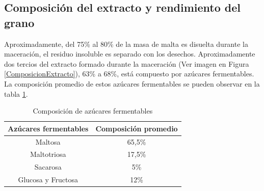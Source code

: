         \subsection{Composición del extracto y rendimiento del grano}
            \par Aproximadamente, del 75\% al 80\% de la masa de malta es disuelta durante la maceración, el residuo insoluble es separado con los desechos. Aproximadamente dos tercios del extracto formado durante la maceración (Ver imagen en Figura \ref{ComposicionExtracto}), 63\% a 68\%, está compuesto por azúcares fermentables. La composición promedio de estos azúcares fermentables se pueden observar en la tabla \ref{tab:ComposicionAzucaresFermentables}.
            
            \begin{table}[h]
                \centering
                \begin{tabular}{|c|c|}
                    \hline
                     Azúcares fermentables &  Composición promedio \\
                     \hline
                     Maltosa & 65,5\% \\
                     \hline
                     Maltotriosa & 17,5\% \\
                     \hline
                     Sacarosa & 5\% \\
                     \hline
                     Glucosa y Fructosa & 12\% \\
                     \hline
                \end{tabular}
                \caption{Composición de azúcares fermentables}
                \label{tab:ComposicionAzucaresFermentables}
            \end{table}
            
